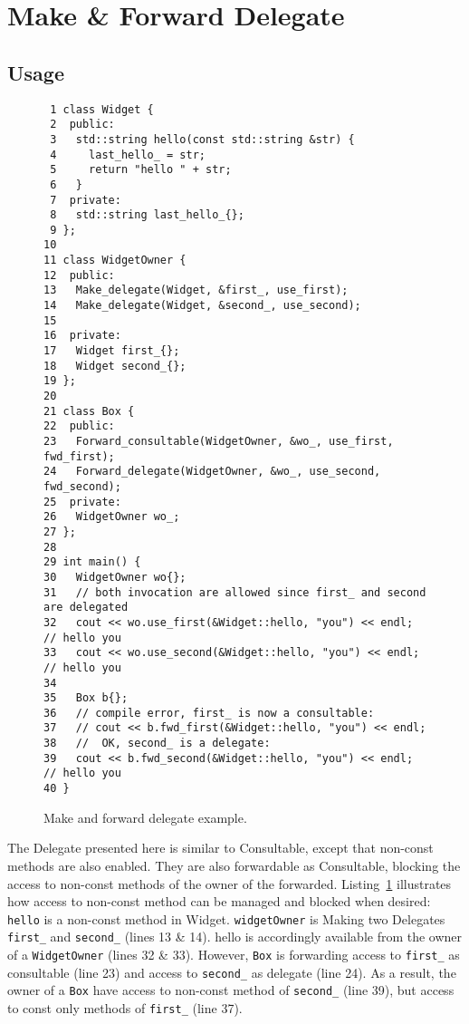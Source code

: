 \documentclass{article}
\begin{document}
\section{Make \& Forward Delegate}

\subsection{Usage}
\begin{figure}[ht]
{\small
\begin{lstlisting}
 1 class Widget {
 2  public:
 3   std::string hello(const std::string &str) {
 4     last_hello_ = str;
 5     return "hello " + str;
 6   }
 7  private:
 8   std::string last_hello_{};
 9 };
10 
11 class WidgetOwner {
12  public:
13   Make_delegate(Widget, &first_, use_first);
14   Make_delegate(Widget, &second_, use_second);
15   
16  private:
17   Widget first_{};
18   Widget second_{};
19 };
20 
21 class Box {
22  public:
23   Forward_consultable(WidgetOwner, &wo_, use_first, fwd_first);
24   Forward_delegate(WidgetOwner, &wo_, use_second, fwd_second);
25  private:
26   WidgetOwner wo_;
27 };
28 
29 int main() {
30   WidgetOwner wo{};
31   // both invocation are allowed since first_ and second are delegated
32   cout << wo.use_first(&Widget::hello, "you") << endl;   // hello you
33   cout << wo.use_second(&Widget::hello, "you") << endl;  // hello you
34 
35   Box b{};
36   // compile error, first_ is now a consultable:
37   // cout << b.fwd_first(&Widget::hello, "you") << endl;  
38   //  OK, second_ is a delegate:
39   cout << b.fwd_second(&Widget::hello, "you") << endl;   // hello you
40 }
\end{lstlisting}}
\cprotect\caption{Make and forward delegate example.}
\label{example:delegate}
\end{figure}

The Delegate presented here is similar to Consultable, except that non-const methods are also enabled. They are also forwardable as Consultable, blocking the access to non-const methods of the owner of the forwarded. Listing~\ref{example:delegate} illustrates how access to non-const method can be managed and blocked when desired: \verb+hello+ is a non-const method in Widget. \verb+widgetOwner+ is Making two Delegates \verb+first_+ and \verb+second_+ (lines 13 \& 14). hello is accordingly available from the owner of a \verb+WidgetOwner+ (lines 32 \& 33). However, \verb+Box+ is forwarding access to \verb+first_+ as consultable (line 23) and access to \verb+second_+ as delegate (line 24). As a result, the owner of a \verb+Box+ have access to non-const method of \verb+second_+ (line 39), but access to const only methods of \verb+first_+ (line 37).     
\end{document}
